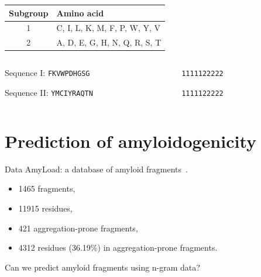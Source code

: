 \documentclass{beamer}\usepackage[]{graphicx}\usepackage[]{color}
\begin{document}
\begin{frame}
\begin{table}
\begin{tabular}{cl}
\toprule
Subgroup & Amino acid \\ 
\midrule
  1 & C, I, L, K, M, F, P, W, Y, V \\ 
\rowcolor[gray]{0.85}  2 & A, D, E, G, H, N, Q, R, S, T \\ 
\bottomrule
\end{tabular}
\end{table}

\begin{columns}
\begin{column}{0.44\textwidth}
 
Sequence I: \texttt{FKVWPDHGSG} \textrightarrow

Sequence II: \texttt{YMCIYRAQTN} \textrightarrow

\end{column}
\begin{column}{0.5\textwidth}  %

\texttt{1111122222}

\texttt{1111122222}
\end{column}
\end{columns}
\end{frame}  



\section{Prediction of amyloidogenicity}

\begin{frame}{Data}
AmyLoad: a database of amyloid fragments~\citep{WozniakAmyLoadwebsitededicated2015}.

\begin{itemize}
 \item 1465 fragments,
 \item 11915 residues,
 \item 421 aggregation-prone fragments,
 \item 4312 residues (36.19\%) in aggregation-prone fragments.
\end{itemize}

\end{frame}


\begin{frame}
Can we predict amyloid fragments using n-gram data?
\end{frame}
\end{document}
